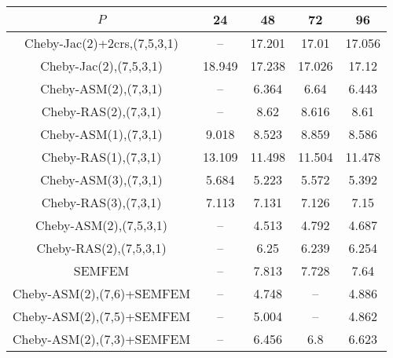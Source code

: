 \begin{table*}
\centering
\begin{tabular}{||c||cccc||}
	\hline
	$P$ & 24 & 48 & 72 & 96 \\
	\hline\hline
	Cheby-Jac(2)+2crs,(7,5,3,1)	&	 --	&	17.201	&	17.01	&	17.056\\
	Cheby-Jac(2),(7,5,3,1)	&	18.949	&	17.238	&	17.026	&	17.12\\
	Cheby-ASM(2),(7,3,1)	&	 --	&	6.364	&	6.64	&	6.443\\
	Cheby-RAS(2),(7,3,1)	&	 --	&	8.62	&	8.616	&	8.61\\
	Cheby-ASM(1),(7,3,1)	&	9.018	&	8.523	&	8.859	&	8.586\\
	Cheby-RAS(1),(7,3,1)	&	13.109	&	11.498	&	11.504	&	11.478\\
	Cheby-ASM(3),(7,3,1)	&	5.684	&	5.223	&	5.572	&	5.392\\
	Cheby-RAS(3),(7,3,1)	&	7.113	&	7.131	&	7.126	&	7.15\\
	Cheby-ASM(2),(7,5,3,1)	&	 --	&	4.513	&	4.792	&	4.687\\
	Cheby-RAS(2),(7,5,3,1)	&	 --	&	6.25	&	6.239	&	6.254\\
	SEMFEM	&	 --	&	7.813	&	7.728	&	7.64\\
	Cheby-ASM(2),(7,6)+SEMFEM	&	 --	&	4.748	&	 --	&	4.886\\
	Cheby-ASM(2),(7,5)+SEMFEM	&	 --	&	5.004	&	 --	&	4.862\\
	Cheby-ASM(2),(7,3)+SEMFEM	&	 --	&	6.456	&	6.8	&	6.623\\
\hline
\end{tabular}
\caption{\label{table:foobar}}
\end{table*}
